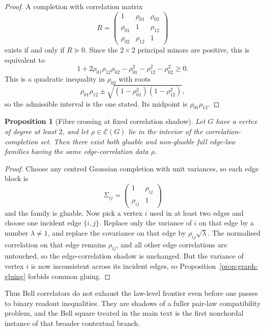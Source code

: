 \documentclass[11pt]{article}
\numberwithin{equation}{section}
\theoremstyle{thmcompact}
\newtheorem{proposition}[theorem]{Proposition}
\theoremstyle{remark}
\begin{document}
\begin{proof}
A completion with correlation matrix
\[
R=\begin{pmatrix}1&\rho_{01}&\rho_{02}\\ \rho_{01}&1&\rho_{12}\\ \rho_{02}&\rho_{12}&1\end{pmatrix}
\]
exists if and only if $R\succeq0$. Since the $2\times2$ principal minors are positive, this is equivalent to
\[
1+2\rho_{01}\rho_{12}\rho_{02}-\rho_{01}^2-\rho_{12}^2-\rho_{02}^2\ge0.
\]
This is a quadratic inequality in $\rho_{02}$ with roots
\[
\rho_{01}\rho_{12}\pm\sqrt{(1-\rho_{01}^2)(1-\rho_{12}^2)},
\]
so the admissible interval is the one stated. Its midpoint is $\rho_{01}\rho_{12}$.
\end{proof}

\begin{proposition}[Fibre crossing at fixed correlation shadow]\label{prop:graph-fibre-crossing}
Let $G$ have a vertex of degree at least $2$, and let $\rho\in\mathcal E(G)$ lie in the interior of the correlation-completion set. Then there exist both gluable and non-gluable full edge-law families having the same edge-correlation data $\rho$.
\end{proposition}

\begin{proof}
Choose any centred Gaussian completion with unit variances, so each edge block is
\[
\Sigma_{ij}=\begin{pmatrix}1 & \rho_{ij}\\ \rho_{ij} & 1\end{pmatrix}
\]
and the family is gluable. Now pick a vertex $i$ used in at least two edges and choose one incident edge $\{i,j\}$. Replace only the variance of $i$ on that edge by a number $\lambda\neq1$, and replace the covariance on that edge by $\rho_{ij}\sqrt{\lambda}$. The normalised correlation on that edge remains $\rho_{ij}$, and all other edge correlations are untouched, so the edge-correlation shadow is unchanged. But the variance of vertex $i$ is now inconsistent across its incident edges, so Proposition~\ref{prop:graph-gluing} forbids common gluing.
\end{proof}

Thus Bell correlators do not exhaust the law-level frontier even before one passes to binary readout inequalities. They are shadows of a fuller pair-law compatibility problem, and the Bell square treated in the main text is the first nonchordal instance of that broader contextual branch.
\end{document}
